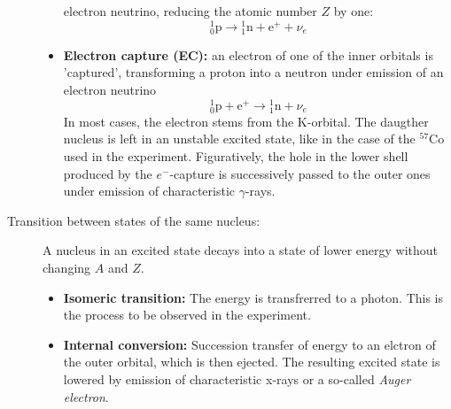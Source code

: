\begin{description}
\begin{itemize}
                electron neutrino, reducing the atomic number $Z$ by one:
                \begin{equation}
                    {}^{1}_{0} \mathrm {p} \to {}^{1}_{1} \mathrm {n} + \mathrm{e}^{+} + \nu_e 
                \end{equation}
            \item
                \textbf{Electron capture (EC):} an electron of one of the inner orbitals is 'captured', transforming a proton 
                into a neutron under emission of an electron neutrino
                \begin{equation}
                    {}^{1}_{0} \mathrm {p} + \mathrm{e}^{+} \to {}^{1}_{1} \mathrm {n} + \nu_e 
                \end{equation}
                In most cases, the electron stems from the K-orbital. The daugther nucleus is left in 
                an unstable excited state, like in the case of the $^{57}$Co used in the experiment. 
                Figuratively, the hole in the lower shell produced by the $e^-$-capture is successively 
                passed to the outer ones under emission of characteristic $\gamma$-rays. 
        \end{itemize}
    \item [Transition between states of the same nucleus:] 
        A nucleus in an excited state decays into a state of 
        lower energy without changing $A$ and $Z$.
        \begin{itemize}
            \item
                \textbf{Isomeric transition:} The energy is transfrerred to a photon. This is the process to be observed 
                in the experiment. 
            \item
                \textbf{Internal conversion:} Succession transfer of energy to an elctron of the outer orbital, 
                which is then ejected. The resulting excited state is lowered by emission of characteristic 
                x-rays or a so-called \emph{Auger electron}. 
        \end{itemize}
\end{description}

